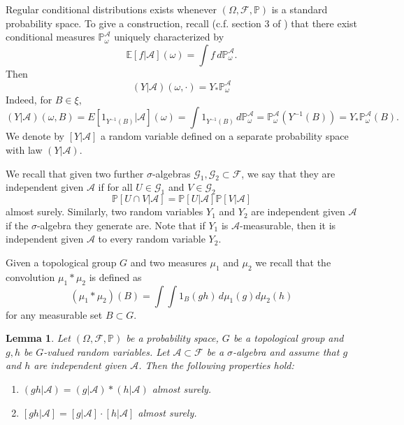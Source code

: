 \documentclass[10pt, english,oneside,reqno]{amsart}
\theoremstyle{plain}
\newtheorem{lemma}[theorem]{Lemma}
\theoremstyle{remark}
\numberwithin{equation}{section}
\numberwithin{figure}{section}
\newcommand{\E}{\mathbb{E}}
\begin{document}
Regular conditional distributions exists whenever $(\Omega, \mathscr{F}, \mathbb{P})$ is a standard probability space. To give a construction, recall (c.f. section 3 of \cite{EinsiedlerWardErgodicBook}) that there exist conditional measures $\mathbb{P}_{\omega}^{\mathscr{A}}$ uniquely characterized by $$\E[f|\mathscr{A}](\omega) = \int f \, d\mathbb{P}_{\omega}^\mathscr{A}.$$ Then $$(Y|\mathscr{A})(\omega, \cdot) = Y_{*}\mathbb{P}_{\omega}^\mathscr{A}$$ Indeed, for $B \in \xi$, $$(Y|\mathscr{A})(\omega, B) = E[1_{Y^{-1}(B)}|\mathscr{A}](\omega) = \int 1_{Y^{-1}(B)} \, d\mathbb{P}_{\omega}^\mathscr{A} = \mathbb{P}_{\omega}^\mathscr{A}(Y^{-1}(B)) = Y_{*}\mathbb{P}_{\omega}^\mathscr{A}(B).$$ We denote by $[Y|\mathscr{A}]$ a random variable defined on a separate probability space with law $(Y|\mathscr{A})$. 

We recall that given two further $\sigma$-algebras $\mathscr{G}_1, \mathscr{G}_2 \subset \mathscr{F}$, we say that they are independent given $\mathscr{A}$ if for all $U \in \mathscr{G}_1$ and $V\in \mathscr{G}_2$ $$\mathbb{P}[U \cap V|\mathscr{A}] = \mathbb{P}[U|\mathscr{A}]\mathbb{P}[V|\mathscr{A}]$$ almost surely. Similarly, two random variables $Y_1$ and $Y_2$ are independent given $\mathscr{A}$ if the $\sigma$-algebra they generate are. Note that if $Y_1$ is $\mathscr{A}$-measurable, then it is independent given $\mathscr{A}$ to every random variable $Y_2$. 

Given a topological group $G$ and two measures $\mu_1$ and $\mu_2$ we recall that the convolution $\mu_1 * \mu_2$ is defined as $$(\mu_1*\mu_2)(B) = \int\int 1_B(gh) \, d\mu_1(g)d\mu_2(h)$$ for any measurable set $B\subset G$.

\begin{lemma}\label{ConditionalConvolution}
    Let $(\Omega, \mathscr{F}, \mathbb{P})$ be a probability space, $G$ be a topological group and $g,h$ be $G$-valued random variables. Let $\mathscr{A} \subset \mathscr{F}$ be a $\sigma$-algebra and assume that $g$ and $h$ are independent given $\mathscr{A}$. Then the following properties hold:
    \begin{enumerate}[label = (\roman*)]
        \item $(gh|\mathscr{A}) = (g|\mathscr{A}) * (h|\mathscr{A})$ almost surely.
        \item $[gh|\mathscr{A}] = [g|\mathscr{A}]\cdot [h|\mathscr{A}]$ almost surely.
    \end{enumerate}
\end{lemma}
\end{document}
